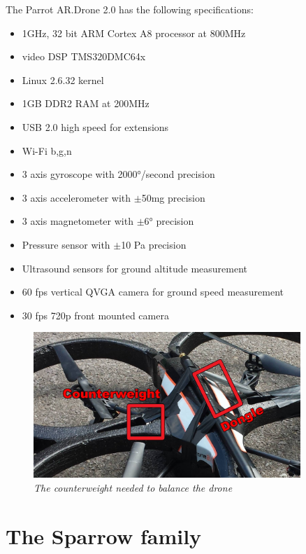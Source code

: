 The Parrot AR.Drone 2.0 has the following specifications:
\begin{itemize}
\item   1GHz, 32 bit ARM Cortex A8 processor at 800MHz
\item   video DSP TMS320DMC64x
\item   Linux 2.6.32 kernel
\item   1GB DDR2 RAM at 200MHz
\item   USB 2.0 high speed for extensions
\item   Wi-Fi b,g,n
\item   3 axis gyroscope with 2000°/second precision
\item   3 axis accelerometer with $\pm$50mg precision
\item   3 axis magnetometer with $\pm$6° precision
\item   Pressure sensor with $\pm$10 Pa precision
\item   Ultrasound sensors for ground altitude measurement
\item   60 fps vertical QVGA camera for ground speed measurement
\item	30 fps 720p front mounted camera 	
\end{itemize}

\begin{figure}[ht]
\begin{center}
\includegraphics[width=0.9\textwidth]{img/counterweight.png}
\end{center}
\caption{\small \itshape{The counterweight needed to balance the drone}}
  \label{fig:counterweight}
\end{figure}


\section{The Sparrow family}

